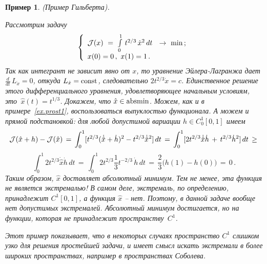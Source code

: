 \documentclass[12pt,a4paper]{article}
\newtheorem{ex}{Пример}
\newcommand{\cJ}{{\cal{J}}}
\begin{document}
\begin{ex}\label{ex.gilb}(Пример Гильберта).
{\em Рассмотрим задачу
\begin{equation}\label{eq.gilb}
\left\{
\begin{array}{l}
\cJ(x) \ = \ \int\limits_0^1 \, t^{2/3}\, \dot x^2\, d t \ \ \to \ \min\, ;\\
x(0) = 0\, , \ x(1) = 1\, .
\end{array}
\right.
\end{equation}
Так как интегрант не зависит явно от $x$, то уравнение Эйлера-Лагранжа дает $\frac{d}{dt}\, L_{\dot x} = 0$,
откуда $L_{\dot x} = {\rm const}$, следовательно $2 t^{2/3} \dot x = c$. Единственное решение
этого дифференциального уравнения, удовлетворяющее начальным условиям, это $\, \hat x (t) = t^{1/3}$.
Докажем, что $\hat x \in {\rm absmin}$. Можем, как и в примере~\ref{ex.prost1}, воспользоваться выпуклостью функционала.
А можем и прямой подстановкой: для любой
допустимой вариации $h\in C^1_0[0,1]$ имеем
$$
\cJ(\hat x + h) - \cJ(\hat x) \, = \,
\int_{0}^1 [t^{2/3}(\dot {\hat x}+\dot h)^2 - t^{2/3}\dot {\hat x}^2]\, d t \, = \,
\int_0^1 [2 t^{2/3} \dot {\hat x} \dot h \, + \,  t^{2/3}\dot h^2]\, d t \, \ge \,
$$
$$
 \int_0^1 2 t^{2/3} \dot {\hat x} \dot h \, d t \, = \, \int_0^1 2 t^{2/3} \frac{1}{3} t^{-2/3}\, \dot h\, d t \, = \,  \frac{2}{3} \bigl( h(1) - h(0) \bigr)\, = \, 0\, .
$$
Таким образом, $\hat x$ доставляет абсолютный минимум. Тем не менее, эта функция не является
экстремалью! В самом деле, экстремаль, по определению, принадлежит $C^1[0,1]$, а функция $\hat x$ -- нет. Поэтому, в данной задаче вообще нет допустимых экстремалей. Абсолютный минимум достигается, но  на функции, которая 
не принадлежит пространству~$C^1$. 

Этот пример показывает, что в некоторых случаях пространство $C^1$ слишком узко для решения простейшей задачи, и имеет смысл искать
экстремали в более широких пространствах, например в пространствах Соболева.
}
\end{ex}
\end{document}
